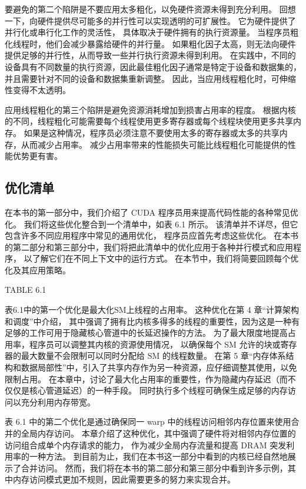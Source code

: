 要避免的第二个陷阱是不要应用太多粗化，以免硬件资源未得到充分利用。 
回想一下，向硬件提供尽可能多的并行性可以实现透明的可扩展性。 它为硬件提供了并行化或串行化工作的灵活性，
具体取决于硬件拥有的执行资源量。 当程序员粗化线程时，他们会减少暴露给硬件的并行量。 
如果粗化因子太高，则无法向硬件提供足够的并行性，从而导致一些并行执行资源未得到利用。 
在实践中，不同的设备具有不同数量的执行资源，因此最佳粗化因子通常是特定于设备和数据集的，
并且需要针对不同的设备和数据集重新调整。 因此，当应用线程粗化时，可伸缩性变得不太透明。

应用线程粗化的第三个陷阱是避免资源消耗增加到损害占用率的程度。 
根据内核的不同，线程粗化可能需要每个线程使用更多寄存器或每个线程块使用更多共享内存。 
如果是这种情况，程序员必须注意不要使用太多的寄存器或太多的共享内存，从而减少占用率。 
减少占用率带来的性能损失可能比线程粗化可能提供的性能优势更有害。

\subsection{优化清单}
在本书的第一部分中，我们介绍了 CUDA 程序员用来提高代码性能的各种常见优化。 
我们将这些优化整合到一个清单中，如表 6.1 所示。 该清单并不详尽，但它包含许多不同应用程序中常见的通用优化，
程序员应首先考虑这些优化。 在本书的第二部分和第三部分中，我们将把此清单中的优化应用于各种并行模式和应用程序，
以了解它们在不同上下文中的运行方式。 在本节中，我们将简要回顾每个优化及其应用策略。

{\color{red} TABLE 6.1}

表6.1中的第一个优化是最大化SM上线程的占用率。 这种优化在第 4 章“计算架构和调度”中介绍，
其中强调了拥有比内核多得多的线程的重要性，因为这是一种有足够的工作可用于隐藏核心管道中的长延迟操作的方法。 
为了最大限度地提高占用率，程序员可以调整其内核的资源使用情况，
以确保每个 SM 允许的块或寄存器的最大数量不会限制可以同时分配给 SM 的线程数量。 
在第 5 章“内存体系结构和数据局部性”中，引入了共享内存作为另一种资源，应仔细调整其使用，以免限制占用。 
在本章中，讨论了最大化占用率的重要性，作为隐藏内存延迟（而不仅仅是核心管道延迟）的一种手段。 
同时执行多个线程可确保生成足够的内存访问以充分利用内存带宽。

表 6.1 中的第二个优化是通过确保同一 warp 中的线程访问相邻内存位置来使用合并的全局内存访问。 
本章介绍了这种优化，其中强调了硬件将对相邻内存位置的访问组合成单个内存请求的能力，
作为减少全局内存流量和提高 DRAM 突发利用率的一种方法。 
到目前为止，我们在本书这一部分中看到的内核已经自然地展示了合并访问。 
然而，我们将在本书的第二部分和第三部分中看到许多示例，其中内存访问模式更加不规则，因此需要更多的努力来实现合并。

